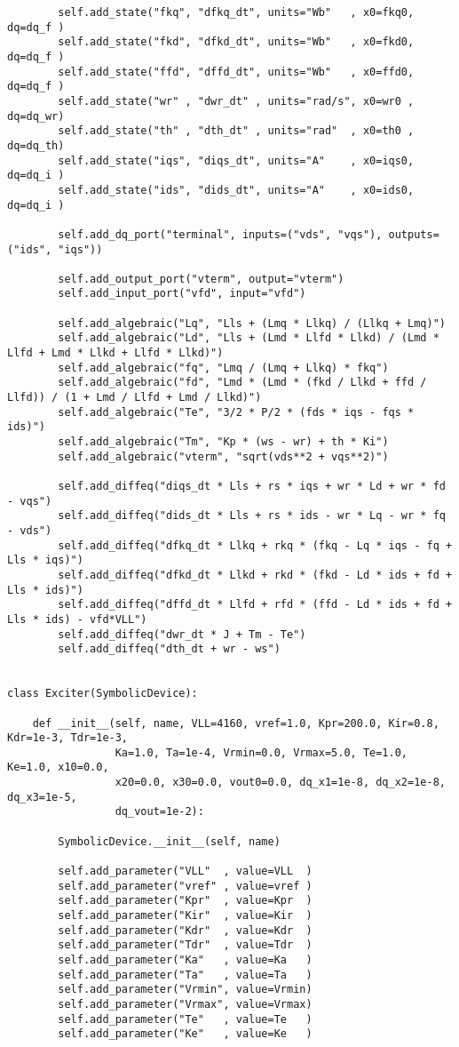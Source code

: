 \begin{lstlisting}
        self.add_state("fkq", "dfkq_dt", units="Wb"   , x0=fkq0, dq=dq_f )
        self.add_state("fkd", "dfkd_dt", units="Wb"   , x0=fkd0, dq=dq_f )
        self.add_state("ffd", "dffd_dt", units="Wb"   , x0=ffd0, dq=dq_f )
        self.add_state("wr" , "dwr_dt" , units="rad/s", x0=wr0 , dq=dq_wr)
        self.add_state("th" , "dth_dt" , units="rad"  , x0=th0 , dq=dq_th)
        self.add_state("iqs", "diqs_dt", units="A"    , x0=iqs0, dq=dq_i )
        self.add_state("ids", "dids_dt", units="A"    , x0=ids0, dq=dq_i )

        self.add_dq_port("terminal", inputs=("vds", "vqs"), outputs=("ids", "iqs"))

        self.add_output_port("vterm", output="vterm")
        self.add_input_port("vfd", input="vfd")

        self.add_algebraic("Lq", "Lls + (Lmq * Llkq) / (Llkq + Lmq)")
        self.add_algebraic("Ld", "Lls + (Lmd * Llfd * Llkd) / (Lmd * Llfd + Lmd * Llkd + Llfd * Llkd)")
        self.add_algebraic("fq", "Lmq / (Lmq + Llkq) * fkq")
        self.add_algebraic("fd", "Lmd * (Lmd * (fkd / Llkd + ffd / Llfd)) / (1 + Lmd / Llfd + Lmd / Llkd)")
        self.add_algebraic("Te", "3/2 * P/2 * (fds * iqs - fqs * ids)")
        self.add_algebraic("Tm", "Kp * (ws - wr) + th * Ki")
        self.add_algebraic("vterm", "sqrt(vds**2 + vqs**2)")

        self.add_diffeq("diqs_dt * Lls + rs * iqs + wr * Ld + wr * fd - vqs")
        self.add_diffeq("dids_dt * Lls + rs * ids - wr * Lq - wr * fq - vds")
        self.add_diffeq("dfkq_dt * Llkq + rkq * (fkq - Lq * iqs - fq + Lls * iqs)")
        self.add_diffeq("dfkd_dt * Llkd + rkd * (fkd - Ld * ids + fd + Lls * ids)")
        self.add_diffeq("dffd_dt * Llfd + rfd * (ffd - Ld * ids + fd + Lls * ids) - vfd*VLL")
        self.add_diffeq("dwr_dt * J + Tm - Te")
        self.add_diffeq("dth_dt + wr - ws")


class Exciter(SymbolicDevice):

    def __init__(self, name, VLL=4160, vref=1.0, Kpr=200.0, Kir=0.8, Kdr=1e-3, Tdr=1e-3,
                 Ka=1.0, Ta=1e-4, Vrmin=0.0, Vrmax=5.0, Te=1.0, Ke=1.0, x10=0.0,
                 x20=0.0, x30=0.0, vout0=0.0, dq_x1=1e-8, dq_x2=1e-8, dq_x3=1e-5,
                 dq_vout=1e-2):

        SymbolicDevice.__init__(self, name)

        self.add_parameter("VLL"  , value=VLL  )
        self.add_parameter("vref" , value=vref )
        self.add_parameter("Kpr"  , value=Kpr  )
        self.add_parameter("Kir"  , value=Kir  )
        self.add_parameter("Kdr"  , value=Kdr  )
        self.add_parameter("Tdr"  , value=Tdr  )
        self.add_parameter("Ka"   , value=Ka   )
        self.add_parameter("Ta"   , value=Ta   )
        self.add_parameter("Vrmin", value=Vrmin)
        self.add_parameter("Vrmax", value=Vrmax)
        self.add_parameter("Te"   , value=Te   )
        self.add_parameter("Ke"   , value=Ke   )


\end{lstlisting}
